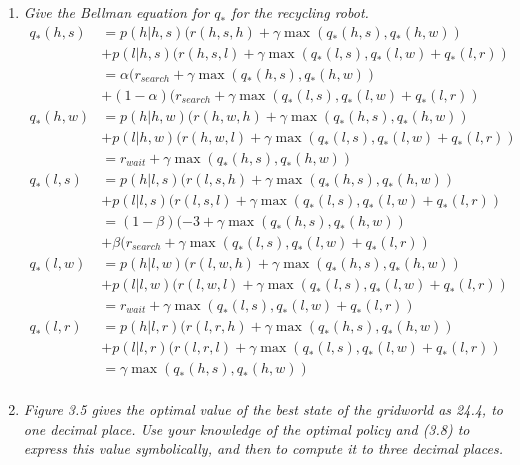 \documentclass[12pt,a4paper]{article}
\begin{document}
\begin{enumerate}
\item
  \textit{Give the Bellman equation for $q_\ast$ for the recycling robot.}
  \begin{align*}
    q_\ast(h, s) &= p(h|h, s) (r(h, s, h) + \gamma \max(q_\ast(h, s), q_\ast(h, w))\\
    & + p(l|h, s) (r(h, s, l) + \gamma \max(q_\ast(l, s), q_\ast(l, w) + q_\ast(l, r))\\
    & = \alpha(r_{search} + \gamma \max(q_\ast(h, s), q_\ast(h, w))\\
    & + (1 - \alpha)(r_{search} + \gamma \max(q_\ast(l, s), q_\ast(l, w) + q_\ast(l, r))\\
    q_\ast(h, w) &= p(h|h, w) (r(h, w, h) + \gamma \max(q_\ast(h, s), q_\ast(h, w))\\
    & + p(l|h, w) (r(h, w, l) + \gamma \max(q_\ast(l, s), q_\ast(l, w) + q_\ast(l, r))\\
    & = r_{wait} + \gamma \max(q_\ast(h, s), q_\ast(h, w))\\
    q_\ast(l, s) &= p(h|l, s) (r(l, s, h) + \gamma \max(q_\ast(h, s), q_\ast(h, w))\\
    & + p(l|l, s) (r(l, s, l) + \gamma \max(q_\ast(l, s), q_\ast(l, w) + q_\ast(l, r))\\
    & = (1 - \beta)(-3 + \gamma \max(q_\ast(h, s), q_\ast(h, w))\\
    & + \beta(r_{search} + \gamma \max(q_\ast(l, s), q_\ast(l, w) + q_\ast(l, r))\\
    q_\ast(l, w) &= p(h|l, w) (r(l, w, h) + \gamma \max(q_\ast(h, s), q_\ast(h, w))\\
    & + p(l|l, w) (r(l, w, l) + \gamma \max(q_\ast(l, s), q_\ast(l, w) + q_\ast(l, r))\\
    & = r_{wait} + \gamma \max(q_\ast(l, s), q_\ast(l, w) + q_\ast(l, r))\\
    q_\ast(l, r) &= p(h|l, r) (r(l, r, h) + \gamma \max(q_\ast(h, s), q_\ast(h, w))\\
    & + p(l|l, r) (r(l, r, l) + \gamma \max(q_\ast(l, s), q_\ast(l, w) + q_\ast(l, r))\\
    & = \gamma \max(q_\ast(h, s), q_\ast(h, w))\\
  \end{align*}

\item
  \textit{Figure 3.5 gives the optimal value of the best state of the gridworld as
  24.4, to one decimal place. Use your knowledge of the optimal policy and (3.8) to express
  this value symbolically, and then to compute it to three decimal places.}


\end{enumerate}
\end{document}
